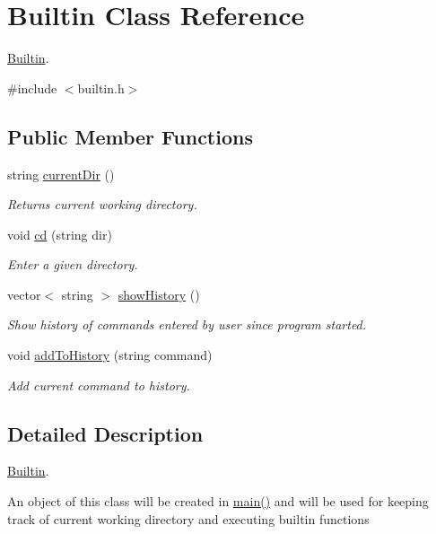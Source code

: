 \hypertarget{classBuiltin}{}\section{Builtin Class Reference}
\label{classBuiltin}


\hyperlink{classBuiltin}{Builtin}.  




{\ttfamily \#include $<$builtin.\+h$>$}

\subsection*{Public Member Functions}
\begin{DoxyCompactItemize}
\item 
string \hyperlink{classBuiltin_a3951c3a66a93e3ec0c6ddd6f772725f5}{current\+Dir} ()
\begin{DoxyCompactList}\small\item\em Returns current working directory. \end{DoxyCompactList}\item 
void \hyperlink{classBuiltin_a63131813bfc980e1058832b1cb295779}{cd} (string dir)
\begin{DoxyCompactList}\small\item\em Enter a given directory. \end{DoxyCompactList}\item 
vector$<$ string $>$ \hyperlink{classBuiltin_acd88fa7ff5d8c910c90575401260bd32}{show\+History} ()
\begin{DoxyCompactList}\small\item\em Show history of commands entered by user since program started. \end{DoxyCompactList}\item 
void \hyperlink{classBuiltin_a950aa984f051c4e32a7ab9a37b146453}{add\+To\+History} (string command)
\begin{DoxyCompactList}\small\item\em Add current command to history. \end{DoxyCompactList}\end{DoxyCompactItemize}


\subsection{Detailed Description}
\hyperlink{classBuiltin}{Builtin}. 

An object of this class will be created in \hyperlink{main_8cpp_abf9e6b7e6f15df4b525a2e7705ba3089}{main()} and will be used for keeping track of current working directory and executing builtin functions

